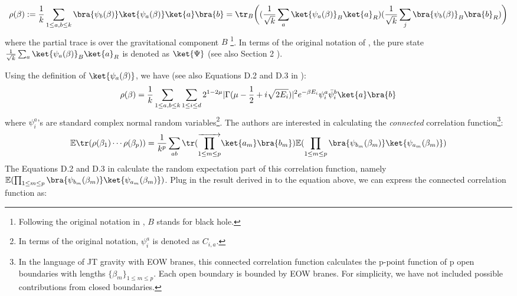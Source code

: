 \documentclass[a4paper,11pt]{article}
\theoremstyle{definition}
\numberwithin{equation}{section}
\begin{document}
\begin{equation}\label{equation:JTdensity}
    \rho(\beta) := \frac{1}{k}\sum_{1\leq a,b\leq k}\bra{\psi_b(\beta)}\ket{\psi_a(\beta)}\ket{a}\bra{b} = \tr_B\bigg((\frac{1}{\sqrt{k}}\sum_a\ket{\psi_a(\beta)}_B\ket{a}_R)(\frac{1}{\sqrt{k}}\sum_j\bra{\psi_b(\beta)}_B\bra{b}_R)\bigg)
\end{equation}
where the partial trace is over the gravitational component $B$ \footnote{Following the original notation in \cite{Penington:2019kki}, $B$ stands for black hole.}. In terms of the original notation of \cite{Penington:2019kki}, the pure state $\frac{1}{\sqrt{k}}\sum_a\ket{\psi_a(\beta)}_B\ket{a}_R$ is denoted as $\ket{\Psi}$ (see also Section 2 \cite{Penington:2019kki}). 

Using the definition of $\ket{\psi_a(\beta)}$, we have (see also Equations D.2 and D.3 in \cite{Penington:2019kki}):
\begin{equation}
    \rho(\beta) = \frac{1}{k}\sum_{1\leq a,b\leq k}\sum_{1\leq i\leq d} 2^{1-2\mu}|\Gamma(\mu - \frac{1}{2} + i\sqrt{2E_i})|^2e^{-\beta E_i}\psi^a_i\bar{\psi}^b_i\ket{a}\bra{b}
\end{equation}
where $\psi_i^a$'s are standard complex normal random variables\footnote{In terms of the original notation, $\psi_i^a$ is denoted as $C_{i,a}$.}. The authors are interested in calculating the \textit{connected} correlation function\footnote{In the language of JT gravity with EOW branes, this connected correlation function calculates the p-point function of p open boundaries with lengths $\{\beta_m\}_{1\leq m\leq p}$. Each open boundary is bounded by EOW branes. For simplicity, we have not included possible contributions from closed boundaries.}:
\begin{equation}
    \mathbb{E}\tr(\rho(\beta_1)\cdots\rho(\beta_p)) = \frac{1}{k^p}\sum_{ab}\tr(\overrightarrow{\prod_{1\leq m\leq p}}\ket{a_m}\bra{b_m})\mathbb{E}(\prod_{1\leq m\leq p}\bra{\psi_{b_m}(\beta_m)}\ket{\psi_{a_m}(\beta_m)})
\end{equation}
The Equations D.2 and D.3 in \cite{Penington:2019kki} calculate the random expectation part of this correlation function, namely $\mathbb{E}(\prod_{1\leq m\leq p}\bra{\psi_{b_m}(\beta_m)}\ket{\psi_{a_m}(\beta_m)})$. Plug in the result derived in \cite{Penington:2019kki} to the equation above, we can express the connected correlation function as:
\end{document}
